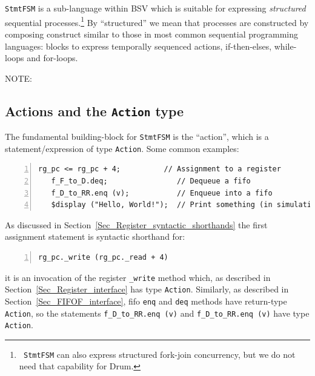 \verb|StmtFSM| is a sub-language within BSV which is suitable for
expressing \emph{structured} sequential processes.\footnote{{\tt
StmtFSM} can also express structured fork-join concurrency, but we do
not need that capability for Drum.}  By ``structured'' we mean that
processes are constructed by composing construct similar to those in
most common sequential programming languages: blocks to express
temporally sequenced actions, if-then-elses, while-loops and
for-loops.

\vspace{2ex}

NOTE:


\subsection{Actions and the {\tt Action} type}


The fundamental building-block for \verb|StmtFSM| is the ``action'',
which is a statement/expression of type \verb|Action|.  Some common
examples:

{\small
\begin{Verbatim}[frame=single, numbers=left]
   rg_pc <= rg_pc + 4;          // Assignment to a register
   f_F_to_D.deq;                // Dequeue a fifo
   f_D_to_RR.enq (v);           // Enqueue into a fifo
   $display ("Hello, World!");  // Print something (in simulation only)
\end{Verbatim}
}

As discussed in
Section~\ref{Sec_Register_syntactic_shorthands}
the first assignment statement is syntactic shorthand for:

{\small
\begin{Verbatim}[frame=single, numbers=left]
   rg_pc._write (rg_pc._read + 4)
\end{Verbatim}
}

{\ie} it is an invocation of the register \verb|_write| method which,
as described in
Section~\ref{Sec_Register_interface} has type
\verb|Action|.  Similarly, as described in
Section~\ref{Sec_FIFOF_interface}, fifo \verb|enq|
and \verb|deq| methods have return-type \verb|Action|, so the
statements \verb|f_D_to_RR.enq (v)| and \verb|f_D_to_RR.enq (v)| have
type \verb|Action|.

